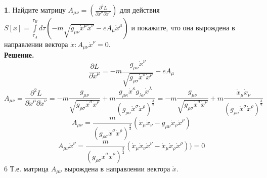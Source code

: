 \documentclass[12pt]{article}
\theoremstyle{definition}
\newtheorem{zad}{}[section]
\begin{document}
\begin{zad}
Найдите матрицу $A_{\mu\nu}=\left(\frac{\partial^2 L}{\partial\dot{x}^\mu\partial\dot{x}^\nu}\right)$ для действия $S[x]=\int\limits_{\tau_A}^{\tau_B}d\tau(-m\sqrt{g_{\mu\nu}\dot{x}^\mu\dot{x}^\nu}-eA_\mu \dot{x}^\mu)$ и покажите, что она вырождена в направлении вектора $\dot{x}:A_{\mu\nu}\dot{x}^\nu=0$.\\
\textbf{Решение.}\\
\begin{equation}
    \frac{\partial L}{\partial\dot{x}^\mu}=-m\frac{g_{\mu\nu}\dot{x}^\nu}{\sqrt{g_{\rho\sigma}\dot{x}^\sigma\dot{x}^\rho}}-eA_\mu
\end{equation}
\begin{equation}
    A_{\mu\nu}=\frac{\partial^2 L}{\partial\dot{x}^\mu\partial\dot{x}^\nu}=-m\frac{g_{\mu\nu}}{\sqrt{g_{\rho\sigma}\dot{x}^\sigma\dot{x}^\rho}}+m\frac{g_{\mu\kappa}\dot{x}^\kappa g_{\lambda\nu}\dot{x}^\lambda}{(g_{\rho\sigma}\dot{x}^\sigma\dot{x}^\rho)^\frac{3}{2}}=-m\frac{g_{\mu\nu}}{\sqrt{g_{\rho\sigma}\dot{x}^\sigma\dot{x}^\rho}}+m\frac{\dot{x}_\mu\dot{x}_\nu}{(g_{\rho\sigma}\dot{x}^\sigma\dot{x}^\rho)^\frac{3}{2}}
\end{equation}
\begin{equation}
    \boxed{A_{\mu\nu}=\frac{m}{(g_{\rho\sigma}\dot{x}^\sigma\dot{x}^\rho)^\frac{3}{2}}(\dot{x}_\mu\dot{x}_\nu-g_{\mu\nu}\dot{x}_\rho\dot{x}^\rho)}
\end{equation}
\begin{equation}
    A_{\mu\nu}\dot{x}^\nu=\frac{m}{(g_{\rho\sigma}\dot{x}^\sigma\dot{x}^\rho)^\frac{3}{2}}(\dot{x}_\mu\dot{x}_\nu\dot{x}^\nu-\dot{x}_\mu\dot{x}_\rho\dot{x}^\rho))=0
\end{equation}6
Т.е. матрица $A_{\mu\nu}$ вырождена в направлении вектора $\dot{x}$.
\end{zad}
\end{document}
